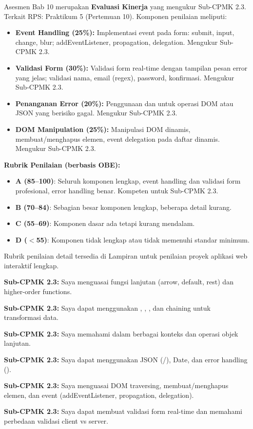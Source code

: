 \documentclass[../main.tex]{subfiles}
\begin{document}
\begin{asesmen}
Asesmen Bab 10 merupakan \textbf{Evaluasi Kinerja} yang mengukur Sub-CPMK 2.3. Terkait RPS: Praktikum 5 (Pertemuan 10). Komponen penilaian meliputi:

\begin{itemize}[leftmargin=*]
  \item \textbf{Event Handling (25\%):} Implementasi event pada form: submit, input, change, blur; addEventListener, propagation, delegation. Mengukur Sub-CPMK 2.3.
  \item \textbf{Validasi Form (30\%):} Validasi form real-time dengan tampilan pesan error yang jelas; validasi nama, email (regex), password, konfirmasi. Mengukur Sub-CPMK 2.3.
  \item \textbf{Penanganan Error (20\%):} Penggunaan  dan  untuk operasi DOM atau JSON yang berisiko gagal. Mengukur Sub-CPMK 2.3.
  \item \textbf{DOM Manipulation (25\%):} Manipulasi DOM dinamis, membuat/menghapus elemen, event delegation pada daftar dinamis. Mengukur Sub-CPMK 2.3.
\end{itemize}

\textbf{Rubrik Penilaian (berbasis OBE):}
\begin{itemize}
  \item \textbf{A (85--100)}: Seluruh komponen lengkap, event handling dan validasi form profesional, error handling benar. Kompeten untuk Sub-CPMK 2.3.
  \item \textbf{B (70--84)}: Sebagian besar komponen lengkap, beberapa detail kurang.
  \item \textbf{C (55--69)}: Komponen dasar ada tetapi kurang mendalam.
  \item \textbf{D ($<$55)}: Komponen tidak lengkap atau tidak memenuhi standar minimum.
\end{itemize}

Rubrik penilaian detail tersedia di Lampiran untuk penilaian proyek aplikasi web interaktif lengkap.
\end{asesmen}

\begin{checklist}
  \item \textbf{Sub-CPMK 2.3:} Saya menguasai fungsi lanjutan (arrow, default, rest) dan higher-order functions.
  \item \textbf{Sub-CPMK 2.3:} Saya dapat menggunakan , , , dan chaining untuk transformasi data.
  \item \textbf{Sub-CPMK 2.3:} Saya memahami  dalam berbagai konteks dan operasi objek lanjutan.
  \item \textbf{Sub-CPMK 2.3:} Saya dapat menggunakan JSON (/), Date, dan error handling ().
  \item \textbf{Sub-CPMK 2.3:} Saya menguasai DOM traversing, membuat/menghapus elemen, dan event (addEventListener, propagation, delegation).
  \item \textbf{Sub-CPMK 2.3:} Saya dapat membuat validasi form real-time dan memahami perbedaan validasi client vs server.
\end{checklist}
\end{document}
